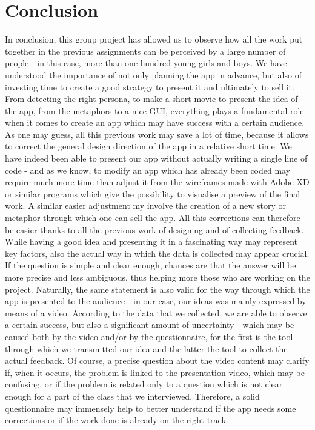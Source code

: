 \documentclass[12pt]{scrartcl}
\begin{document}
			
\section{Conclusion}

	
	In conclusion, this group project has allowed us to observe how all the work put together in the previous assignments can be perceived by a large number of people - in this case, more than one hundred young girls and boys. We have understood the importance of not only planning the app in advance, but also of investing time to create a good strategy to present it and ultimately to sell it. From detecting the right persona, to make a short movie to present the idea of the app, from the metaphors to a nice GUI, everything plays a fundamental role when it comes to create an app which may have success with a certain audience. As one may guess, all this previous work may save a lot of time, because it allows to correct the general design direction of the app in a relative short time. We have indeed been able to present our app without actually writing a single line of code - and as we know, to modify an app which has already been coded may require much more time than adjust it from the wireframes made with Adobe XD or similar programs which give the possibility to visualise a preview of the final work. A similar easier adjustment my involve the creation of a new story or metaphor through which one can sell the app. All this corrections can therefore be easier thanks to all the previous work of designing and of collecting feedback.\\
	
	While having a good idea and presenting it in a fascinating way may represent key factors, also the actual way in which the data is collected may appear crucial. If the question is simple and clear enough, chances are that the answer will be more precise and less ambiguous, thus helping more those who are working on the project. Naturally, the same statement is also valid for the way through which the app is presented to the audience - in our case, our ideas was mainly expressed by means of a video. According to the data that we collected, we are able to observe a certain success, but also a significant amount of uncertainty - which may be caused both by the video and/or by the questionnaire, for the first is the tool through which we transmitted our idea and the latter the tool to collect the actual feedback. Of course, a precise question about the video content may clarify if, when it occurs, the problem is linked to the presentation video, which may be confusing, or if the problem is related only to a question which is not clear enough for a part of the class that we interviewed. Therefore, a solid questionnaire may immensely help to better understand if the app needs some corrections or if the work done is already on the right track.\\
  
\end{document}
